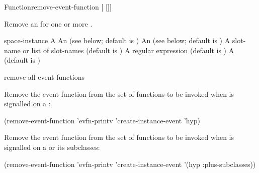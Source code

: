 \documentclass[10pt,twoside,english,pdftex]{article}
\begin{document}

\begin{functiondoc}{Function}{remove-event-function}%
{ [ 
[]] \\
 }
%


\fnsyntax

\fnpurpose Remove an  for one or more .

\fnpackage {}

\fnmodule {}

\fnargs
\begin{args}{space-instance}
\arg[function] A 
 An  
(see below; default is )
 An 
(see below; default is )
 A slot-name or list of slot-names
(default is )
 A  regular expression
(default is \code{(*)})
\arg[permanent] A  (default is \nil)
\end{args}

\fndsyntax
\eventclassspec
\subeventingspec
\syntaxsep
\unitclassinstancespec
\subclassingspec

\begin{alsos}{remove-all-event-functions}
\end{alsos}

\fnexamples
{}%
Remove the event function  from the set of functions
to be invoked when  is signalled on a
 :
\begin{example}
  (remove-event-function 'evfn-printv 'create-instance-event 'hyp)
\end{example}

Remove the event function  from the set of functions
to be invoked when  is signalled on a
  or its subclasses:
\begin{example}
  (remove-event-function 'evfn-printv 'create-instance-event '(hyp :plus-subclasses))
\end{example}

\fnnotes
\instanceevfnsnyi

\end{functiondoc}
\end{document}
